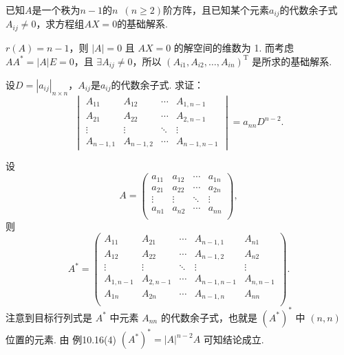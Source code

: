 \begin{exercise}
\begin{exgroup}
        \item 已知$A$是一个秩为$n-1$的$n\enspace(n \geqslant 2)$阶方阵，且已知某个元素$a_{ij}$的代数余子式$A_{ij} \neq 0$，求方程组$AX=0$的基础解系.
        \begin{answer}
            $r(A) = n-1$，则 $\lvert A \rvert = 0$ 且 $AX = 0$ 的解空间的维数为 1. 而考虑 $AA^* = \lvert A \rvert E = 0$，且 $\exists A_{ij} \neq 0$，所以 $(A_{i1}, A_{i2}, \ldots , A_{in})^{\mathrm{T}}$ 是所求的基础解系.
        \end{answer}

        \item 设$D=|a_{ij}|_{n \times n}$，$A_{ij}$是$a_{ij}$的代数余子式. 求证：
        \[\begin{vmatrix}
                A_{11}    & A_{12}    & \cdots & A_{1,n-1}   \\
                A_{21}    & A_{22}    & \cdots & A_{2,n-1}   \\
                \vdots    & \vdots    & \ddots & \vdots      \\
                A_{n-1,1} & A_{n-1,2} & \cdots & A_{n-1,n-1}
            \end{vmatrix}=a_{nn}D^{n-2}.\]
        \begin{answer}
            设 \[A = \begin{pmatrix}
                a_{11} & a_{12} & \cdots & a_{1n} \\
                a_{21} & a_{22} & \cdots & a_{2n} \\
                \vdots & \vdots & \ddots & \vdots \\
                a_{n1} & a_{n2} & \cdots & a_{nn} \\
            \end{pmatrix},\]
            则 \[A^* = \begin{pmatrix}
                    A_{11}     & A_{21}     & \cdots & A_{n-1, 1}   & A_{n1}     \\
                    A_{12}     & A_{22}     & \cdots & A_{n-1, 2}   & A_{n2}     \\
                    \vdots     & \vdots     & \ddots & \vdots       & \vdots     \\
                    A_{1, n-1} & A_{2, n-1} & \cdots & A_{n-1, n-1} & A_{n, n-1} \\
                    A_{1n}     & A_{2n}     & \cdots & A_{n-1, n}   & A_{nn}     \\
                \end{pmatrix}.\]
            注意到目标行列式是 $A^*$ 中元素 $A_{nn}$ 的代数余子式，也就是 $(A^*)^*$ 中 $(n, n)$ 位置的元素. 由 {例10.16(4)} $(A^*)^* = \lvert A \rvert^{n-2}A$ 可知结论成立. %
        \end{answer}


\end{exgroup}
\end{exercise}
